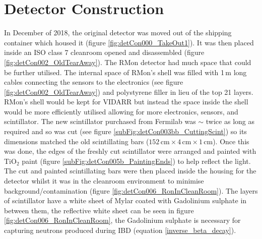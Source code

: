 \section{Detector Construction}\label{sec:DetectorConstruction}
In December of 2018, the original detector was moved out of the shipping container which housed it (figure \ref{fig:detCon000_TakeOut1}). It was then placed inside an ISO class 7 cleanroom opened and disassembled (figure \ref{fig:detCon002_OldTearAway}). The RMon detector had much space that could be further utilised. The internal space of RMon's shell was filled with 1\,m long cables connecting the sensors to the electronics (see figure \ref{fig:detCon002_OldTearAway}) and polystyrene filler in lieu of the top 21 layers. RMon's shell would be kept for VIDARR but instead the space inside the shell would be more efficiently utilised allowing for more electronics, sensors, and scintillator. The new scintillator purchased from Fermilab was $\sim$ twice as long as required and so was cut (see figure \ref{subFig:detCon003bb_CuttingScint}) so its dimensions matched the old scintillating bars ($152\,\textrm{cm} \times 4\,\textrm{cm} \times 1\,\textrm{cm}$). Once this was done, the edges of the freshly cut scintillator were arranged and painted with TiO$_2$ paint (figure \ref{subFig:detCon005b_PaintingEnds}) to help reflect the light. The cut and painted scintillating bars were then placed inside the housing for the detector whilst it was in the cleanroom environment to minimise background/contamination (figure \ref{fig:detCon006_RonInCleanRoom}). The layers of scintillator have a white sheet of Mylar coated with Gadolinium sulphate in between them, the reflective white sheet can be seen in figure \ref{fig:detCon006_RonInCleanRoom}, the Gadolinium sulphate is necessary for capturing neutrons produced during IBD (equation \ref{inverse_beta_decay}). 

